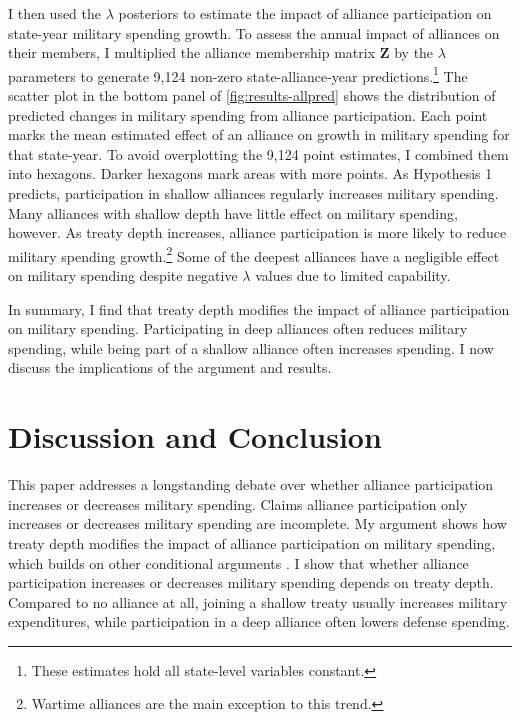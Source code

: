 \documentclass[12pt]{article}
\begin{document}
I then used the $\lambda$ posteriors to estimate the impact of alliance participation on state-year military spending growth. 
To assess the annual impact of alliances on their members, I multiplied the alliance membership matrix $\textbf{Z}$ by the $\lambda$ parameters to generate 9,124 non-zero state-alliance-year predictions.\footnote{These estimates hold all state-level variables constant.} 
The scatter plot in the bottom panel of \autoref{fig:results-allpred} shows the distribution of predicted changes in military spending from alliance participation.
Each point marks the mean estimated effect of an alliance on growth in military spending for that state-year.
To avoid overplotting the 9,124 point estimates, I combined them into hexagons. 
Darker hexagons mark areas with more points. 
As Hypothesis 1 predicts, participation in shallow alliances regularly increases military spending. 
Many alliances with shallow depth have little effect on military spending, however. 
As treaty depth increases, alliance participation is more likely to reduce military spending growth.\footnote{Wartime alliances are the main exception to this trend.}
Some of the deepest alliances have a negligible effect on military spending despite negative $\lambda$ values due to limited capability. 


In summary, I find that treaty depth modifies the impact of alliance participation on military spending.  
Participating in deep alliances often reduces military spending, while being part of a shallow alliance often increases spending. 
I now discuss the implications of the argument and results. 



\section{Discussion and Conclusion}


This paper addresses a longstanding debate over whether alliance participation increases or decreases military spending. 
Claims alliance participation only increases or decreases military spending are incomplete. 
My argument shows how treaty depth modifies the impact of alliance participation on military spending, which builds on other conditional arguments \citep{DigiuseppePoast2016}. 
I show that whether alliance participation increases or decreases military spending depends on treaty depth. 
Compared to no alliance at all, joining a shallow treaty usually increases military expenditures, while participation in a deep alliance often lowers defense spending. 
\end{document}
